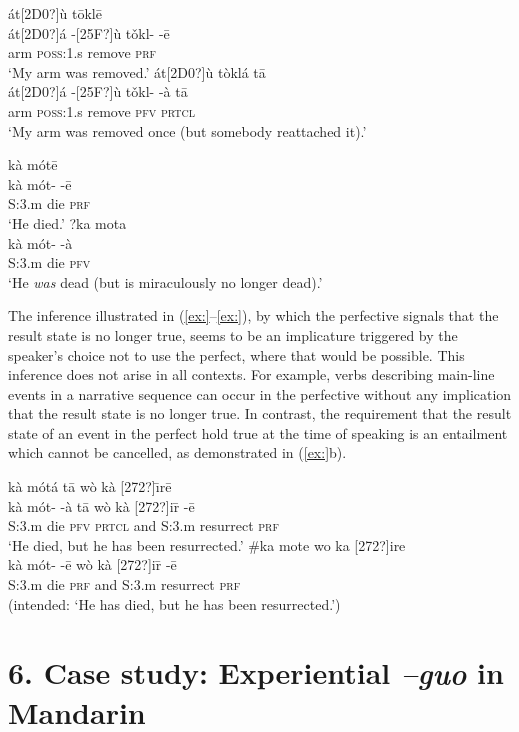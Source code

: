 \ea
\ea  \glll át[2D0?]ù    tōklē\\
át[2D0?]á  -[25F?]ù  tǒkl-  -ē\\
arm  \textsc{poss}:1.s  remove  \textsc{prf}\\
\glt ‘My arm was removed.’
\ex \glll  át[2D0?]ù    tòklá    tā\\
át[2D0?]á  -[25F?]ù  tǒkl-  -à  tā\\
arm  \textsc{poss}:1.s  remove  \textsc{pfv}  \textsc{prtcl}\\
\glt ‘My arm was removed once (but somebody reattached it).’
\z \z

\ea
\ea  \glll kà  mótē\\
kà  mót-  -ē\\
S:3.m  die  \textsc{prf}\\
\glt ‘He died.’
\ex \glll ?ka  mota\\
 kà  mót-  -à\\
S:3.m  die  \textsc{pfv}\\
\glt ‘He \textit{was} dead (but is miraculously no longer dead).’
\z \z


The inference illustrated in (\ref{ex:}--\ref{ex:}), by which the perfective signals that the result state is no longer true, seems to be an implicature triggered by the speaker’s choice not to use the perfect, where that would be possible. This inference does not arise in all contexts. For example, verbs describing main-line events in a narrative sequence can occur in the perfective without any implication that the result state is no longer true. In contrast, the requirement that the result state of an event in the perfect hold true at the time of speaking is an entailment which cannot be cancelled, as demonstrated in (\ref{ex:}b).


\ea
\ea  \glll kà  mótá    tā  wò  kà  [272?]\={\i}rē\\
kà  mót-  -à  tā  wò  kà  [272?]i\={r}  -ē\\
S:3.m  die  \textsc{pfv}  \textsc{prtcl}  and  S:3.m  resurrect  \textsc{prf}\\
\glt ‘He died, but he has been resurrected.’
\ex \glll  \#ka  mote    wo  ka  [272?]ire\\
  kà  mót-  -ē  wò  kà  [272?]i\={r}  -ē\\
S:3.m  die  \textsc{prf}  and  S:3.m  resurrect  \textsc{prf}\\
\glt (intended: ‘He has died, but he has been resurrected.’)
\z \z

\section{6. Case study: Experiential \textit{–guo} in Mandarin}\label{sec:}

